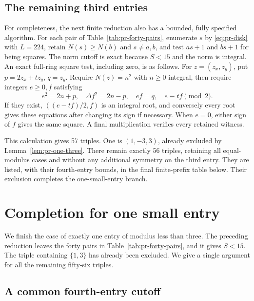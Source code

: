 \documentclass[12pt]{article}
\numberwithin{equation}{section}
\begin{document}
\subsection{The remaining third entries}

For completeness, the next finite reduction also has a bounded,
fully specified algorithm. For each pair of
Table~\ref{tab:pr-forty-pairs}, enumerate \(s\) by
\eqref{eq:pr-disk} with \(L=224\), retain \(N(s)\ge N(b)\) and
\(s\ne a,b\), and test \(as+1\) and \(bs+1\) for being squares.
The norm cutoff is exact because \(S<15\) and the norm is integral.
An exact full-ring square test, including zero, is as follows.
For \(z=(z_x,z_y)\), put \(p=2z_x+tz_y\), \(q=z_y\).
Require \(N(z)=n^2\) with \(n\ge0\) integral, then require integers
\(e\ge0,f\) satisfying
\[
 e^2=2n+p,\quad \Delta f^2=2n-p,\quad ef=q,
 \quad e\equiv tf\pmod2.
\]
If they exist, \(((e-tf)/2,f)\) is an integral root, and conversely
every root gives these equations after changing its sign if necessary.
When \(e=0\), either sign of \(f\) gives the same square. A final
multiplication verifies every retained witness.

This calculation gives 57 triples. One is
\((1,-3,3)\), already excluded by Lemma~\ref{lem:pr-one-three}.
There remain exactly 56 triples, retaining all equal-modulus cases and
without any additional symmetry on the third entry. They are listed,
with their fourth-entry bounds, in the final finite-prefix table below.
Their exclusion completes the one-small-entry branch.

\section{Completion for one small entry}\label{sec:fixed56}

We finish the case of exactly one entry of modulus less than three.
The preceding reduction leaves the forty pairs in
Table~\ref{tab:pr-forty-pairs}, and it gives $S<15$.
The triple containing $\{1,3\}$ has already been excluded.
We give a single argument for all the remaining fifty-six triples.

\subsection{A common fourth-entry cutoff}
\end{document}
